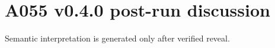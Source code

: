 \section*{A055 v0.4.0 post-run discussion}
Semantic interpretation is generated only after verified reveal.
